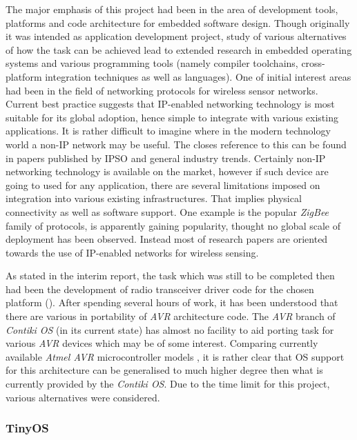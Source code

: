 

  The major emphasis of this project had been in the area of development
 tools, platforms and code architecture for embedded software design.
 Though originally it was intended as application development project,
 study of various alternatives of how the task can be achieved lead to
 extended research in embedded operating systems and various programming
 tools (namely compiler toolchains, cross-platform integration techniques
 as well as languages).
  One of initial interest areas had been in the field of networking protocols
 for wireless sensor networks. Current best practice suggests that IP-enabled
 networking technology is most suitable for its global adoption, hence simple
 to integrate with various existing applications. It is rather difficult to
 imagine where in the modern technology world a non-IP network may be useful.
 The closes reference to this can be found in papers published by IPSO 
 \cite{IPSO_PAPERS} and general industry trends. Certainly non-IP networking
 technology is available on the market, however if such device are going to
 used for any application, there are several limitations imposed on integration
 into various existing infrastructures. That implies physical connectivity
 as well as software support. One example is the popular \emph{ZigBee}
 family of protocols, is apparently gaining popularity, thought no global
 scale of deployment has been observed. Instead most of research papers
 are oriented towards the use of IP-enabled networks for wireless sensing.

  As stated in the interim report, the task which was still to be
 completed then had been the development of radio transceiver driver
 code for the chosen platform (). After spending
 several hours of work, it has been understood that there are various
 in portability of \emph{AVR} architecture code. The \emph{AVR} branch
 of \emph{Contiki OS} (in its current state) has almost no facility to
 aid porting task for various \emph{AVR} devices which may be of some
 interest. Comparing currently available \emph{Atmel AVR} microcontroller
 models \cite{atmel:avr:table}, it is rather clear that OS support for
 this architecture can be generalised to much higher degree then what is
 currently provided by the \emph{Contiki OS}. Due to the time limit for
 this project, various alternatives were considered.

\subsubsection{TinyOS}

